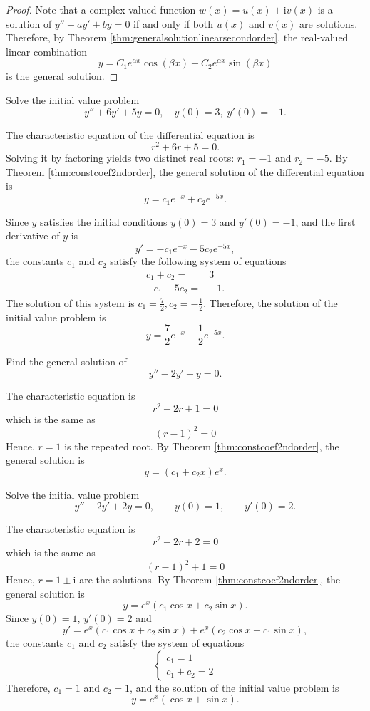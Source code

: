 \begin{proof}
Note that a complex-valued function $w(x)=u(x)+\mathrm{i}v(x)$ is a solution of $y''+ay'+by=0$ if and only if both $u(x)$ and $v(x)$ are solutions. Therefore, by Theorem \ref{thm:generalsolutionlinearsecondorder}, the real-valued linear combination 
\[y=C_1e^{\alpha x}\cos(\beta  x)+C_2e^{\alpha x}\sin(\beta x)\]
is the general solution.
\end{proof}


\begin{example}
Solve the initial value problem 
\[y''+ 6y'+5y=0, \quad y(0)=3,\; y'(0)=-1.\]
\end{example}
\begin{solution}
The characteristic equation of the differential equation is
\[r^2+6r+5=0.\]
Solving it by factoring yields two distinct real roots: $r_1=-1$ and $r_2=-5$. By Theorem \ref{thm:constcoef2ndorder}, the general solution of the differential equation is
\[y=c_1e^{-x}+c_2e^{-5x}.\]

Since $y$ satisfies the initial conditions $y(0)=3$ and $y'(0)=-1$, and the first derivative of $y$ is
\[y'=-c_1e^{-x}-5c_2e^{-5x},\]
the constants $c_1$ and $c_2$ satisfy the following system of equations
\[
\begin{aligned}
  c_1+ c_2 = & 3 \\ -c_1-5c_2 = & -1.
\end{aligned}
\]
The solution of this system is $c_1=\frac72,c_2=-\frac12$. Therefore, the solution of the initial value problem is
\[y=\frac{7}{2}e^{-x}-\frac{1}{2}e^{-5x}.\]
\end{solution}

\begin{example}
Find the general solution of 
\[  y'' -2y' + y =0.\]
\end{example}
\begin{solution}
The characteristic equation is 
\[r^2 -2r + 1 =0\]
which is the same as 
\[(r-1)^2 =0 \]
Hence, $r=1$ is the repeated root. 
By Theorem \ref{thm:constcoef2ndorder}, the general solution is 
\[y= (c_1  + c_2 x) e^{x}.\]
\end{solution}

\begin{example}
Solve the initial value problem
\[  y'' -2y' + 2y = 0,\qquad y(0)=1,\qquad y'(0)=2.\]
\end{example}
\begin{solution}
The characteristic equation is 
\[r^2 -2r + 2 =0\]
which is the same as 
\[(r-1)^2 + 1 =0 \]
Hence, $r=1\pm \mathrm{i}$ are the solutions. 
By Theorem \ref{thm:constcoef2ndorder}, the general solution is 
\[y= e^x(c_1\cos x + c_2\sin x).\]
Since $y(0)=1$, $y'(0)=2$ and
\[y'=e^x(c_1\cos x + c_2\sin x)+e^x(c_2\cos x - c_1\sin x),\]
the constants $c_1$ and $c_2$ satisfy the system of equations
\[
  \begin{cases}
    c_1=1\\
    c_1+c_2=2
  \end{cases}
\]
Therefore, $c_1=1$ and $c_2=1$, and the solution of the initial value problem is
\[y=e^x(\cos x + \sin x).\]
\end{solution}

